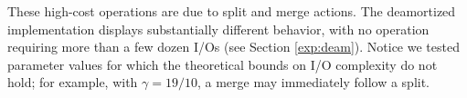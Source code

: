 \documentclass[11pt,letterpaper]{article}
\begin{document}
These high-cost operations are due to split and merge actions. 
The deamortized implementation displays substantially different behavior, with no operation requiring more than a few dozen I/Os (see Section \ref{exp:deam}).  Notice we tested parameter values for which the theoretical bounds on I/O complexity do not hold; for example, with $\gamma=19/10$, a merge may immediately follow a split.


\vspace{-0.25cm}
\begin{table}[!h]
\small
\centering
{}


\end{table}
\end{document}

